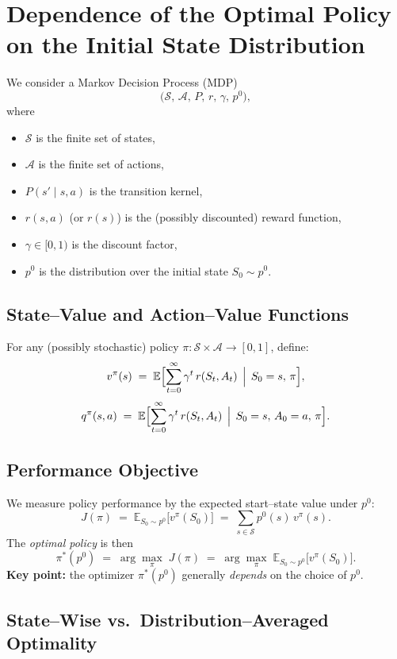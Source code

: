 \section{Dependence of the Optimal Policy on the Initial State Distribution}

We consider a Markov Decision Process (MDP)
\[
\bigl(\mathcal{S},\,\mathcal{A},\,P,\,r,\,\gamma,\,p^0\bigr),
\]
where
\begin{itemize}
  \item $\mathcal{S}$ is the finite set of states,
  \item $\mathcal{A}$ is the finite set of actions,
  \item $P(s' \mid s,a)$ is the transition kernel,
  \item $r(s,a)$ (or $r(s)$) is the (possibly discounted) reward function,
  \item $\gamma\in[0,1)$ is the discount factor,
  \item $p^0$ is the distribution over the initial state $S_0\sim p^0$.
\end{itemize}

\subsection{State–Value and Action–Value Functions}
For any (possibly stochastic) policy $\pi:\mathcal{S}\times\mathcal{A}\to[0,1]$, define:
\[
v^\pi(s) \;=\; \mathbb{E}\Bigl[\sum_{t=0}^\infty \gamma^t\,r(S_t,A_t)\,\Bigm|\,S_0=s,\,\pi\Bigr],
\]
\[
q^\pi(s,a) \;=\; \mathbb{E}\Bigl[\sum_{t=0}^\infty \gamma^t\,r(S_t,A_t)\,\Bigm|\,S_0=s,\,A_0=a,\,\pi\Bigr].
\]

\subsection{Performance Objective}
We measure policy performance by the expected start–state value under $p^0$:
\[
J(\pi)
\;=\;
\mathbb{E}_{S_0\sim p^0}\!\bigl[v^\pi(S_0)\bigr]
\;=\;
\sum_{s\in\mathcal{S}} p^0(s)\,v^\pi(s).
\]
The \emph{optimal policy} is then
\[
\pi^*(p^0)
\;=\;
\arg\max_{\pi}\;J(\pi)
\;=\;
\arg\max_{\pi}\;\mathbb{E}_{S_0\sim p^0}\!\bigl[v^\pi(S_0)\bigr].
\]
\textbf{Key point:} the optimizer $\pi^*(p^0)$ generally \emph{depends} on the choice of $p^0$.

\subsection{State–Wise vs.\ Distribution–Averaged Optimality}

